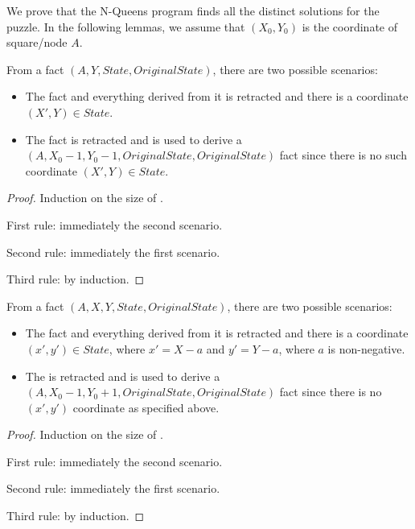 We prove that the N-Queens program finds all the distinct solutions for the
puzzle. In the following lemmas, we assume that $(X_0, Y_0)$ is the coordinate
of square/node $A$.

\begin{lemma}

From a fact $(A, Y, State, OriginalState)$, there are two possible
scenarios:

\begin{itemize}
   \item The  fact and everything derived from it is retracted and
      there is a coordinate $(X', Y) \in State$.
   \item The  fact is retracted and is used to derive a
      $(A, X_0 - 1, Y_0 - 1,
      OriginalState, OriginalState)$ fact since 
      there is no such coordinate $(X', Y) \in State$.
\end{itemize}

\end{lemma}
\begin{proof}
Induction on the size of .

First rule: immediately the second scenario.

Second rule: immediately the first scenario.

Third rule: by induction.
\end{proof}

\begin{lemma}
   From a fact $(A, X, Y, State, OriginalState)$, there are
  two possible scenarios:
   
  \begin{itemize}
     \item The  fact and everything derived from it is
        retracted and there is a coordinate $(x', y') \in State$, where $x' = X
        - a$ and $y' = Y - a$, where $a$ is non-negative.
     \item The  is retracted and is used to derive a
        $(A, X_0 - 1, Y_0 + 1, OriginalState, OriginalState)$
        fact since there is no $(x', y')$ coordinate as specified above.
  \end{itemize}
\end{lemma}
\begin{proof}
Induction on the size of .

First rule: immediately the second scenario.

Second rule: immediately the first scenario.

Third rule: by induction.
\end{proof}

